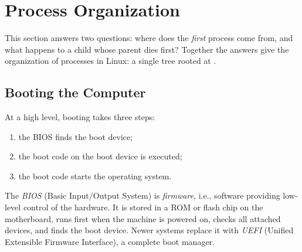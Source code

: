 \section{Process Organization}
\label{sec:org}

This section answers two questions: where does the \emph{first} process come from, and what happens to a child whose parent dies first? Together the answers give the organization of processes in Linux: a single tree rooted at .

\subsection{Booting the Computer}

At a high level, booting takes three steps:
\begin{enumerate}
  \item the BIOS finds the boot device;
  \item the boot code on the boot device is executed;
  \item the boot code starts the operating system.
\end{enumerate}

\begin{definition}[BIOS]
  The \emph{BIOS} (Basic Input/Output System) is \emph{firmware}, i.e., software providing low-level control of the hardware. It is stored in a ROM or flash chip on the motherboard, runs first when the machine is powered on, checks all attached devices, and finds the boot device. Newer systems replace it with \emph{UEFI} (Unified Extensible Firmware Interface), a complete boot manager.
\end{definition}

